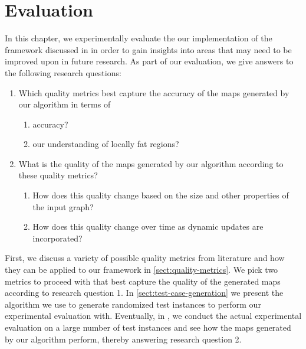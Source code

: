 \chapter{Evaluation}
\label{chap:evaluation}

In this chapter, we experimentally evaluate the our implementation of the framework discussed in  in order to gain insights into areas that may need to be improved upon in future research.
As part of our evaluation, we give answers to the following research questions:

\begin{enumerate}
	\item Which quality metrics best capture the accuracy of the maps generated by our algorithm in terms of
	\begin{enumerate}
	\item accuracy?
	\item our understanding of locally fat regions?
	\end{enumerate}
	\item What is the quality of the maps generated by our algorithm according to these quality metrics?
	\begin{enumerate}
	\item How does this quality change based on the size and other properties of the input graph?
	\item How does this quality change over time as dynamic updates are incorporated?
	\end{enumerate}
\end{enumerate}

First, we discuss a variety of possible quality metrics from literature and how they can be applied to our framework in \cref{sect:quality-metrics}.
We pick two metrics to proceed with that best capture the quality of the generated maps according to research question 1.
In \cref{sect:test-case-generation} we present the algorithm we use to generate randomized test instances to perform our experimental evaluation with.
Eventually, in , we conduct the actual experimental evaluation on a large number of test instances and see how the maps generated by our algorithm perform, thereby answering research question 2.


\clearpage

\clearpage

\clearpage

